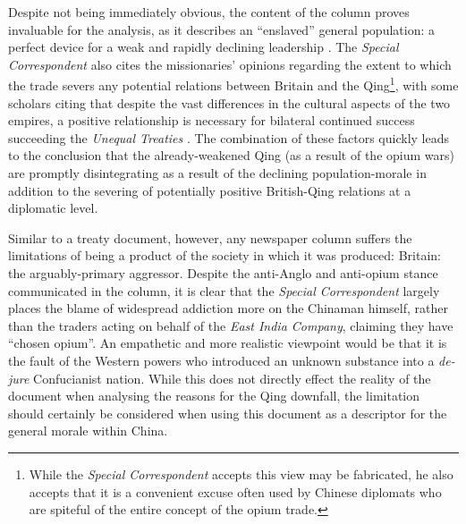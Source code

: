 \documentclass[a4paper,oneside]{article}
\begin{document}

Despite not being immediately obvious, the content of the column proves
invaluable for the analysis, as it describes an ``enslaved'' general population:
a perfect device for a weak and rapidly declining leadership
\autocite{Rotberg:2003}. The \textit{Special Correspondent} also cites the
missionaries' opinions regarding the extent to which the trade severs any
potential relations between Britain and the Qing\footnote{While the
\textit{Special Correspondent} accepts this view may be fabricated, he also
accepts that it is a convenient excuse often used by Chinese diplomats who are
spiteful of the entire concept of the opium trade.}, with some scholars citing
that despite the vast differences in the cultural aspects of the two empires, a
positive relationship is necessary for bilateral continued success succeeding
the \textit{Unequal Treaties} \autocite{Fairbank:1942}. The combination of these
factors quickly leads to the conclusion that the already-weakened Qing (as a
result of the opium wars) are promptly disintegrating as a result of the
declining population-morale in addition to the severing of potentially positive
British-Qing relations at a diplomatic level.

Similar to a treaty document, however, any newspaper column suffers the
limitations of being a product of the society in which it was produced: Britain:
the arguably-primary aggressor. Despite the anti-Anglo and anti-opium stance
communicated in the column, it is clear that the \textit{Special Correspondent}
largely places the blame of widespread addiction more on the Chinaman himself,
rather than the traders acting on behalf of the \textit{East India Company},
claiming they have ``chosen opium''. An empathetic and more realistic viewpoint
would be that it is the fault of the Western powers who introduced an unknown
substance into a \textit{de-jure} Confucianist \autocite{Billioud:2007} nation.
While this does not directly effect the reality of the document when analysing
the reasons for the Qing downfall, the limitation should certainly be considered
when using this document as a descriptor for the general morale within China.
\end{document}

